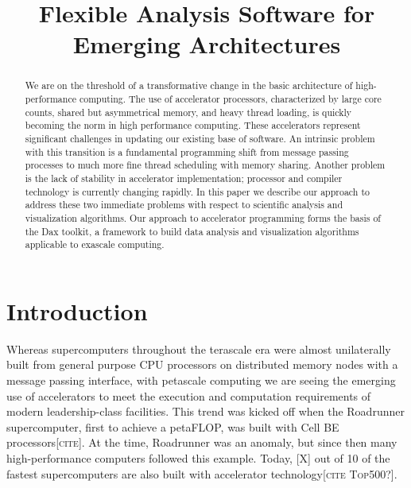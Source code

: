 \documentclass[conference]{IEEEtran}
\author{
  \IEEEauthorblockN{Kenneth~Moreland}
  \IEEEauthorblockA{Sandia National Laboratories\\
    Albuquerque, NM 87185-1326\\
    Email: kmorel@sandia.gov}
  \and
  \IEEEauthorblockN{Others}
  \IEEEauthorblockA{Cool Group\\
    Somewhere, WQ 12341\\
    Email: person@myspace.com}
}
\title{Flexible Analysis Software for Emerging Architectures}
\newcommand{\fix}[1]{{\color{red}\textsc{[#1]}}}
\begin{document}
\sloppy

\maketitle

\begin{abstract}
  We are on the threshold of a transformative change in the basic
  architecture of high-performance computing.  The use of accelerator
  processors, characterized by large core counts, shared but asymmetrical
  memory, and heavy thread loading, is quickly becoming the norm in high
  performance computing.  These accelerators represent significant
  challenges in updating our existing base of software.  An intrinsic
  problem with this transition is a fundamental programming shift from
  message passing processes to much more fine thread scheduling with memory
  sharing.  Another problem is the lack of stability in accelerator
  implementation; processor and compiler technology is currently changing
  rapidly.  In this paper we describe our approach to address these two
  immediate problems with respect to scientific analysis and visualization
  algorithms.  Our approach to accelerator programming forms the basis of
  the Dax toolkit, a framework to build data analysis and visualization
  algorithms applicable to exascale computing.
\end{abstract}

\section{Introduction}
\label{sec:Introduction}

\noindent
Whereas supercomputers throughout the terascale era were almost
unilaterally built from general purpose CPU processors on distributed
memory nodes with a message passing interface, with petascale computing we
are seeing the emerging use of accelerators to meet the execution and
computation requirements of modern leadership-class facilities.  This trend
was kicked off when the Roadrunner supercomputer, first to achieve a
petaFLOP, was built with Cell BE processors\fix{cite}.  At the time,
Roadrunner was an anomaly, but since then many high-performance computers
followed this example.  Today, \fix{X} out of 10 of the fastest supercomputers
are also built with accelerator technology\fix{cite Top500?}.
\end{document}
